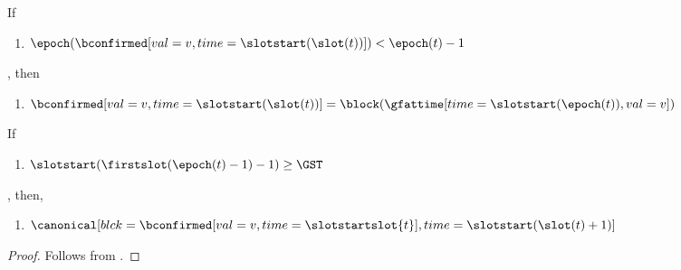 \documentclass{article}
\begin{document}
\begin{lemma}\label{lem:epoch-conf-less-prev-then-conf-finalized}
    If
    \begin{enumerate}
        \item $\epoch(\bconfirmed[val=v,time=\slotstart(\slot(t))]) < \epoch(t) - 1$
    \end{enumerate},
    then
    \begin{enumerate}
        \item $\bconfirmed[val=v,time=\slotstart(\slot(t))] = \block(\gfattime[time=\slotstart(\epoch(t)),val=v])$
    \end{enumerate}
\end{lemma}

\begin{lemma}
    If
    \begin{enumerate}
        \item $\slotstart(\firstslot(\epoch(t)-1)-1)\geq \GST$
    \end{enumerate},
    then,
    \begin{enumerate}
        \item $\canonical[blck={\bconfirmed[val=v,time=\slotstartslot{t}]},time=\slotstart(\slot(t)+1)]$
    \end{enumerate}    
\end{lemma}
\begin{proof}
    Follows from .
\end{proof}

\end{document}
